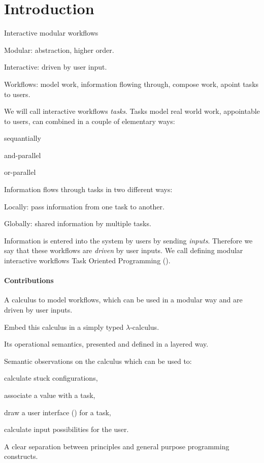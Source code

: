 


\section{Introduction}


Interactive modular workflows
\begin{itemize*}
  \item Modular: abstraction, higher order.
  \item Interactive: driven by user input.
  \item Workflows: model work, information flowing through, compose work, apoint tasks to users.
\end{itemize*}

We will call interactive workflows \emph{tasks}.
Tasks model real world work, appointable to users,
can combined in a couple of elementary ways:
\begin{itemize*}
  \item sequantially
  \item and-parallel
  \item or-parallel
\end{itemize*}
Information flows through tasks in two different ways:
\begin{enumerate*}
  \item Locally: pass information from one task to another.
  \item Globally: shared information by multiple tasks.
\end{enumerate*}
Information is entered into the system by users by sending \emph{inputs}.
Therefore we say that these workflows are \emph{driven} by user inputs.
We call defining modular interactive workflows Task Oriented Programming (\TOP).

\paragraph{Contributions}
\begin{itemize*}
  \item A calculus to model workflows, which can be used in a modular way and are driven by user inputs.
  \item Embed this calculus in a simply typed $\lambda$-calculus.
  \item Its operational semantics, presented and defined in a layered way.
  \item Semantic observations on the calculus which can be used to:
  \begin{itemize*}
    \item calculate stuck configurations,
    \item associate a value with a task,
    \item draw a user interface (\UI) for a task,
    \item calculate input possibilities for the user.
  \end{itemize*}
  \item A clear separation between \TOP principles and general purpose programming constructs.
\end{itemize*}


